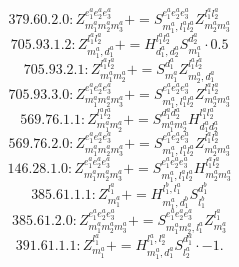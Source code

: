 \documentclass[letterpaper,10pt,fleqn,leqno,onecolumn]{article}
\begin{document}
\begin{equation} \;\;\;\;\;\;  379.60.2.0: Z^{e_{1}^{a}e_{2}^{a}e_{3}^{a}}_{m_{1}^{a}m_{2}^{a}m_{3}^{a}}+=S^{e_{1}^{a}e_{2}^{a}e_{3}^{a}}_{m_{1}^{a},l_{1}^{a}l_{2}^{a}}Z^{l_{1}^{a}l_{2}^{a}}_{m_{2}^{a}m_{3}^{a}} \end{equation}
\begin{equation} \;\;\;\;\;\;  705.93.1.2: Z^{l_{1}^{a}l_{2}^{a}}_{m_{1}^{a},d_{1}^{a}}+=H^{l_{1}^{a}l_{2}^{a}}_{d_{1}^{a},d_{2}^{a}}S^{d_{2}^{a}}_{m_{1}^{a}}\cdot 0.5 \end{equation}
\begin{equation} \;\;\;\;\;\;  705.93.2.1: Z^{l_{1}^{a}l_{2}^{a}}_{m_{1}^{a}m_{2}^{a}}+=S^{d_{1}^{a}}_{m_{1}^{a}}Z^{l_{1}^{a}l_{2}^{a}}_{m_{2}^{a},d_{1}^{a}} \end{equation}
\begin{equation} \;\;\;\;\;\;  705.93.3.0: Z^{e_{1}^{a}e_{2}^{a}e_{3}^{a}}_{m_{1}^{a}m_{2}^{a}m_{3}^{a}}+=S^{e_{1}^{a}e_{2}^{a}e_{3}^{a}}_{m_{1}^{a},l_{1}^{a}l_{2}^{a}}Z^{l_{1}^{a}l_{2}^{a}}_{m_{2}^{a}m_{3}^{a}} \end{equation}
\begin{equation} \;\;\;\;\;\;  569.76.1.1: Z^{l_{1}^{a}l_{2}^{a}}_{m_{1}^{a}m_{2}^{a}}+=S^{d_{1}^{a}d_{2}^{a}}_{m_{1}^{a}m_{2}^{a}}H^{l_{1}^{a}l_{2}^{a}}_{d_{1}^{a}d_{2}^{a}} \end{equation}
\begin{equation} \;\;\;\;\;\;  569.76.2.0: Z^{e_{1}^{a}e_{2}^{a}e_{3}^{a}}_{m_{1}^{a}m_{2}^{a}m_{3}^{a}}+=S^{e_{1}^{a}e_{2}^{a}e_{3}^{a}}_{m_{1}^{a},l_{1}^{a}l_{2}^{a}}Z^{l_{1}^{a}l_{2}^{a}}_{m_{2}^{a}m_{3}^{a}} \end{equation}
\begin{equation} \;\;\;\;\;\;  146.28.1.0: Z^{e_{1}^{a}e_{2}^{a}e_{3}^{a}}_{m_{1}^{a}m_{2}^{a}m_{3}^{a}}+=S^{e_{1}^{a}e_{2}^{a}e_{3}^{a}}_{m_{1}^{a},l_{1}^{a}l_{2}^{a}}H^{l_{1}^{a}l_{2}^{a}}_{m_{2}^{a}m_{3}^{a}} \end{equation}
\begin{equation} \;\;\;\;\;\;  385.61.1.1: Z^{l_{1}^{a}}_{m_{1}^{a}}+=H^{l_{1}^{b},l_{1}^{a}}_{m_{1}^{a},d_{1}^{b}}S^{d_{1}^{b}}_{l_{1}^{b}} \end{equation}
\begin{equation} \;\;\;\;\;\;  385.61.2.0: Z^{e_{1}^{a}e_{2}^{a}e_{3}^{a}}_{m_{1}^{a}m_{2}^{a}m_{3}^{a}}+=S^{e_{1}^{a}e_{2}^{a}e_{3}^{a}}_{m_{1}^{a}m_{2}^{a},l_{1}^{a}}Z^{l_{1}^{a}}_{m_{3}^{a}} \end{equation}
\begin{equation} \;\;\;\;\;\;  391.61.1.1: Z^{l_{1}^{a}}_{m_{1}^{a}}+=H^{l_{1}^{a},l_{2}^{a}}_{m_{1}^{a},d_{1}^{a}}S^{d_{1}^{a}}_{l_{2}^{a}}\cdot -1. \end{equation}
\end{document}
